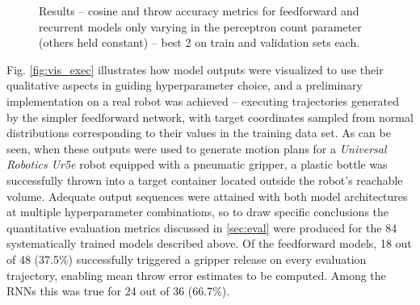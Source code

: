 \documentclass{article}
\begin{document}
\begin{figure}[!hbt]
	\centering
	\caption{Results -- cosine and throw accuracy metrics for feedforward and recurrent models only varying in the perceptron count parameter (others held constant) -- best 2 on train and validation sets each.}
	\label{fig:ind_rnn_naive}
\end{figure}

Fig. \ref{fig:vis_exec} illustrates how model outputs were visualized to use their qualitative aspects in guiding hyperparameter choice, and a preliminary implementation on a real robot was achieved -- executing trajectories generated by the simpler feedforward network, with target coordinates sampled from normal distributions corresponding to their values in the training data set. As can be seen, when these outputs were used to generate motion plans for a \emph{Universal Robotics Ur5e} robot equipped with a pneumatic gripper, a plastic bottle was successfully thrown into a target container located outside the robot's reachable volume. Adequate output sequences were attained with both model architectures at multiple hyperparameter combinations, so to draw specific conclusions the quantitative evaluation metrics discussed in \ref{sec:eval} were produced for the 84 systematically trained models described above. Of the feedforward models, 18 out of 48 (37.5\%) successfully triggered a gripper release on every evaluation trajectory, enabling mean throw error estimates to be computed. Among the RNNs this was true for 24 out of 36 (66.7\%).
\end{document}

